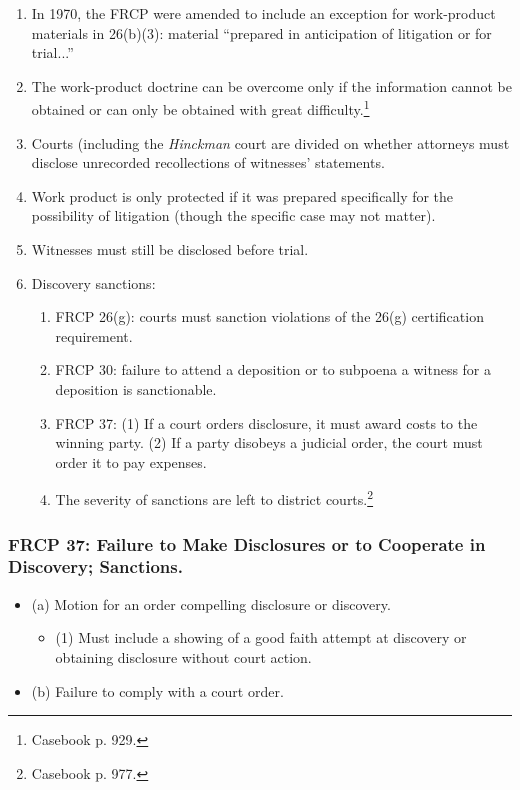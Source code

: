 \begin{enumerate}
    \item In 1970, the FRCP were amended to include an exception for 
    work-product materials in 26(b)(3): material ``prepared in anticipation of 
    litigation or for trial...''
    \item The work-product doctrine can be overcome only if the information 
    cannot be obtained or can only be obtained with great 
    difficulty.\footnote{Casebook p. 929.}
    \item Courts (including the \emph{Hinckman} court are divided on whether 
    attorneys must disclose unrecorded recollections of witnesses' statements.
    \item Work product is only protected if it was prepared specifically for 
    the possibility of litigation (though the specific case may not matter).
    \item Witnesses must still be disclosed before trial.
    \item Discovery sanctions:
    \begin{enumerate}
        \item FRCP 26(g): courts must sanction violations of the 26(g) 
        certification requirement.
        \item FRCP 30: failure to attend a deposition or to subpoena a witness 
        for a deposition is sanctionable.
        \item FRCP 37: (1) If a court orders disclosure, it must award costs 
        to the winning party. (2) If a party disobeys a judicial order, the 
        court must order it to pay expenses.
        \item The severity of sanctions are left to district 
        courts.\footnote{Casebook p. 977.}
    \end{enumerate}
\end{enumerate}

\subsubsection{FRCP 37: Failure to Make Disclosures or to Cooperate in 
Discovery; Sanctions.}

\begin{itemize}
    \item (a) Motion for an order compelling disclosure or discovery.
    \begin{itemize}
        \item (1) Must include a showing of a good faith attempt at discovery 
        or obtaining disclosure without court action.
    \end{itemize}
    \item (b) Failure to comply with a court order.
\end{itemize}

